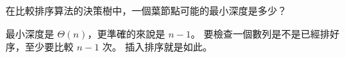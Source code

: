 \startEXERCISE
在比較排序算法的決策樹中，一個葉節點可能的最小深度是多少？
\stopEXERCISE

\startANSWER
最小深度是 $\Theta(n)$，更準確的來說是 $n-1$。
要檢查一個數列是不是已經排好序，至少要比較 $n-1$ 次。
插入排序就是如此。
\stopANSWER
